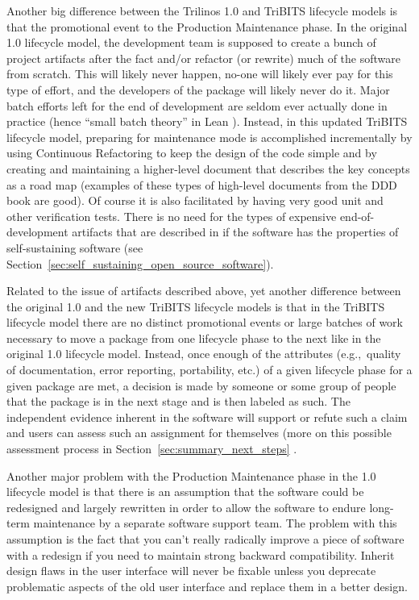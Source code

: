 \documentclass[11pt]{SANDreport}
\begin{document}
Another big difference between the Trilinos 1.0 and TriBITS lifecycle
models is that the promotional event to the Production Maintenance
phase.  In the original 1.0 lifecycle model, the development team is
supposed to create a bunch of project artifacts after the fact and/or
refactor (or rewrite) much of the software from scratch.  This will
likely never happen, no-one will likely ever pay for this type of
effort, and the developers of the package will likely never do it.
Major batch efforts left for the end of development are seldom ever
actually done in practice (hence ``small batch theory'' in Lean
{}\cite{ImplementingLeanSoftwareDevelopment}).  Instead, in this
updated TriBITS lifecycle model, preparing for maintenance mode is
accomplished incrementally by using Continuous Refactoring to keep the
design of the code simple and by creating and maintaining a
higher-level document that describes the key concepts as a road map
(examples of these types of high-level documents from the DDD book are
good).  Of course it is also facilitated by having very good unit and
other verification tests.  There is no need for the types of expensive
end-of-development artifacts that are described in
{}\cite{TrilinosLifecycleModel2007} if the software has the properties
of self-sustaining software (see
Section~\ref{sec:self_sustaining_open_source_software}).

Related to the issue of artifacts described above, yet another
difference between the original 1.0 and the new TriBITS lifecycle
models is that in the TriBITS lifecycle model there are no distinct
promotional events or large batches of work necessary to move a
package from one lifecycle phase to the next like in the original 1.0
lifecycle model.  Instead, once enough of the attributes (e.g.,\
quality of documentation, error reporting, portability, etc.) of a
given lifecycle phase for a given package are met, a decision is made
by someone or some group of people that the package is in the next
stage and is then labeled as such.  The independent evidence inherent
in the software will support or refute such a claim and users can
assess such an assignment for themselves (more on this possible
assessment process in Section~\ref{sec:summary_next_steps} .

Another major problem with the Production Maintenance phase in the 1.0
lifecycle model is that there is an assumption that the software could
be redesigned and largely rewritten in order to allow the software to
endure long-term maintenance by a separate software support team.  The
problem with this assumption is the fact that you can't really
radically improve a piece of software with a redesign if you need to
maintain strong backward compatibility.  Inherit design flaws in the
user interface will never be fixable unless you deprecate problematic
aspects of the old user interface and replace them in a better design.
\end{document}

